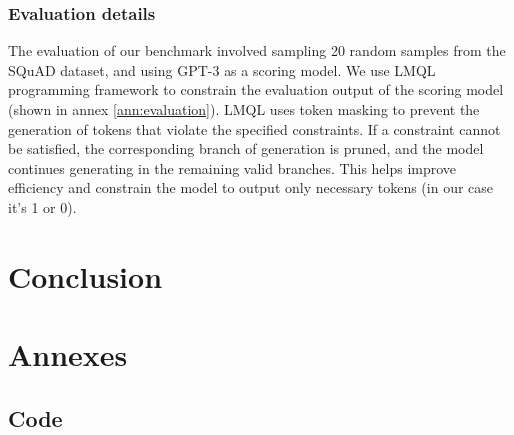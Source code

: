 \documentclass[a4paper,12pt]{article}
\begin{document}
\subsubsection*{Evaluation details}
The evaluation of our benchmark involved sampling 20 random samples from the SQuAD \cite{squad} dataset, and using GPT-3 \cite{gpt3} as a scoring model.
We use LMQL \cite{lmql} programming framework to constrain the evaluation output of the scoring model (shown in annex \ref*{ann:evaluation}). LMQL uses token masking to prevent the generation of tokens that violate the specified constraints. 
If a constraint cannot be satisfied, the corresponding branch of generation is pruned, and the model continues generating in the remaining valid branches. This helps improve efficiency and constrain the model to output only necessary tokens 
(in our case it's 1 or 0).

\section{Conclusion}

\twocolumn


\clearpage


\onecolumn
\section{Annexes}

\subsection{Code}
\end{document}
